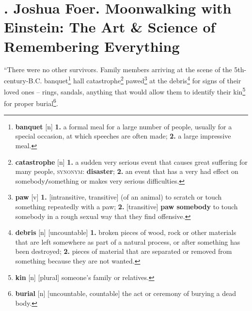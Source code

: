 \documentclass[oneside]{book}
\numberwithin{equation}{section}
\begin{document}

\chapter{\cite{Foer2012}. Joshua Foer. Moonwalking with Einstein: The Art \& Science of Remembering Everything}

``There were no other survivors. Family members arriving at the scene of the 5th-century-B.C. banquet\footnote{\textbf{banquet} [n] \textbf{1.} a formal meal for a large number of people, usually for a special occasion, at which speeches are often made; \textbf{2.} a large impressive meal.} hall catastrophe\footnote{\textbf{catastrophe} [n] \textbf{1.} a sudden very serious event that causes great suffering for many people, \textsc{synonym}: \textbf{disaster}; \textbf{2.} an event that has a very had effect on somebody\texttt{/}something or makes very serious difficulties.} pawed\footnote{\textbf{paw} [v] \textbf{1.} [intransitive, transitive] (of an animal) to scratch or touch something repeatedly with a paw; \textbf{2.} [transitive] \textbf{paw somebody} to touch somebody in a rough sexual way that they find offensive.} at the debris\footnote{\textbf{debris} [n] [uncountable] \textbf{1.} broken pieces of wood, rock or other materials that are left somewhere as part of a natural process, or after something has been destroyed; \textbf{2.} pieces of material that are separated or removed from something because they are not wanted.} for signs of their loved ones -- rings, sandals, anything that would allow them to identify their kin\footnote{\textbf{kin} [n] [plural] someone's family or relatives.} for proper burial\footnote{\textbf{burial} [n] [uncountable, countable] the act or ceremony of burying a dead body.}.
\end{document}
